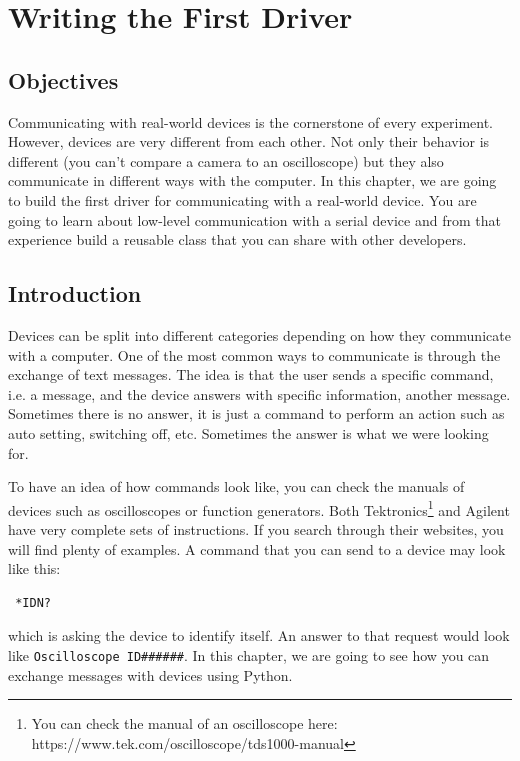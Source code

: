 \chapter{Writing the First Driver}\label{chapter:first-driver}
\section{Objectives}
Communicating with real-world devices is the cornerstone of every experiment. However, devices are very different from each other. Not only their behavior is different (you can't compare a camera to an oscilloscope) but they also communicate in different ways with the computer. In this chapter, 
we are going to build the first driver for communicating with a real-world device. You are going to learn about low-level communication with a serial device and from that experience build a reusable class that you can share with other developers. 

\section{Introduction}
Devices can be split into different categories depending on how they communicate with a computer. One of the most common ways to communicate is through the exchange of text messages. The idea is that the user sends a specific command, i.e. a message, and the device answers with specific information, another message. Sometimes there is no answer, it is just a command to perform an action such as auto setting, switching off, etc. Sometimes the answer is what we were looking for. 

To have an idea of how commands look like, you can check the manuals of devices such as oscilloscopes or function generators. Both Tektronics\footnote{You can check the manual of an oscilloscope here: https://www.tek.com/oscilloscope/tds1000-manual} and Agilent have very complete sets of instructions. If you search through their websites, you will find plenty of examples. A command that you can send to a device may look like this:

\begin{verbatim}
 *IDN?
\end{verbatim}
  
which is asking the device to identify itself. An answer to that request would look like \texttt{Oscilloscope ID\#\#\#\#\#\#}. In this chapter, we are going to see how you can exchange messages with devices using Python. 

